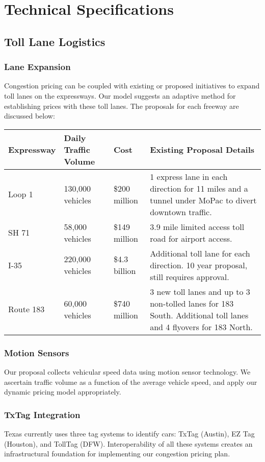 \documentclass[7pt]{article}
\begin{document}
\section{Technical Specifications}
\subsection{Toll Lane Logistics}
\subsubsection{Lane Expansion}
Congestion pricing can be coupled with existing or proposed initiatives to expand toll lanes on the expressways. Our model suggests an adaptive method for establishing prices with these toll lanes. The proposals for each freeway are discussed below:

\begin{center}
    \begin{tabular}{ | l | l | l | p{5cm} |}
    \hline
    Expressway & Daily Traffic Volume & Cost & Existing Proposal Details \\ \hline
    Loop 1 & 130,000 vehicles & \$200 million & 1 express lane in each direction for 11 miles and a tunnel under MoPac to divert downtown traffic. \\ \hline
    SH 71 & 58,000 vehicles & \$149 million & 3.9 mile limited access toll road for airport access. \\ \hline
    I-35 & 220,000 vehicles & \$4.3 billion & Additional toll lane for each direction. 10 year proposal, still requires approval.\\ \hline
    Route 183 & 60,000 vehicles & \$740 million & 3 new toll lanes and up to 3 non-tolled lanes for 183 South. Additional toll lanes and 4 flyovers for 183 North. \\ \hline 
	\end{tabular}
\end{center}

\subsubsection{Motion Sensors}
Our proposal collects vehicular speed data using motion sensor technology. We ascertain traffic volume as a function of the average vehicle speed, and apply our dynamic pricing model appropriately.

\subsubsection{TxTag Integration}
Texas currently uses three tag systems to identify cars: TxTag (Austin), EZ Tag (Houston), and TollTag (DFW). Interoperability of all these systems creates an infrastructural foundation for implementing our congestion pricing plan. 
\end{document}
